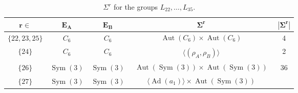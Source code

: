 \documentclass[dvipsnames]{article}
\theoremstyle{definition}
\theoremstyle{remark}
\DeclareMathOperator{\Sym}{Sym}
\DeclareMathOperator{\Aut}{Aut}
\DeclareMathOperator{\Ad}{Ad}
\begin{document}
    \begin{longtable}{ |c|c|c|c|c|}
    \caption{$\Sigma^r$ for the groups $L_{22}, \dots, L_{35}$.}
    \label{tbl:sigmasK66}\\
    \hline
    $\boldsymbol{r\in}$ & $\boldsymbol{E_A}$ & $\boldsymbol{E_B}$ & $\boldsymbol{\Sigma^r}$ & $\boldsymbol{|\Sigma^r|}$\\
    \hline
    $\{22,23,25\}$
    &
    $C_6$
    &
    $C_6$
    &
    \begin{minipage}{3.5cm}
        {
        \vspace{-2.5mm}
        \begin{align*}
            \Aut(C_6) \times \Aut(C_6)
        \end{align*}
        \vspace{-5mm}
        }
    \end{minipage}
    &4\\
    \hline
    $\{24\}$
    &
    $C_6$
    &
    $C_6$
    &
    \begin{minipage}{3.5cm}
        {
        \vspace{-2.5mm}
        \begin{align*}
            \langle \left(\rho_A, \rho_B \right) \rangle
        \end{align*}
        \vspace{-5mm}
        }
    \end{minipage}
    &2\\
    \hline
    $\{26\}$
    &
    $\Sym(3)$
    &
    $\Sym(3)$
    &
    \begin{minipage}{3.5cm}
        {
        \vspace{-2.5mm}
        \begin{align*}
            \Aut(\Sym(3)) \times \Aut(\Sym(3))
        \end{align*}
        \vspace{-5mm}
        }
    \end{minipage}
    &36\\
    \hline
    $\{27\}$
    &
    $\Sym(3)$
    &
    $\Sym(3)$
    &
    \begin{minipage}{3.5cm}
        {
        \vspace{-2.5mm}
        \begin{align*}
             \langle \Ad(a_1) \rangle \times \Aut(\Sym(3))
        \end{align*}
        \vspace{-5mm}
        }
    \end{minipage}

\end{longtable}
\end{document}
